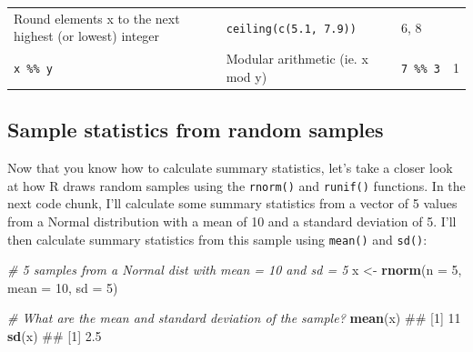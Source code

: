 \documentclass[]{book}
\newenvironment{Shaded}{\begin{snugshade}}{\end{snugshade}}
\newcommand{\KeywordTok}[1]{\textcolor[rgb]{0.13,0.29,0.53}{\textbf{{#1}}}}
\newcommand{\DataTypeTok}[1]{\textcolor[rgb]{0.13,0.29,0.53}{{#1}}}
\newcommand{\DecValTok}[1]{\textcolor[rgb]{0.00,0.00,0.81}{{#1}}}
\newcommand{\StringTok}[1]{\textcolor[rgb]{0.31,0.60,0.02}{{#1}}}
\newcommand{\CommentTok}[1]{\textcolor[rgb]{0.56,0.35,0.01}{\textit{{#1}}}}
\newcommand{\NormalTok}[1]{{#1}}
\theoremstyle{definition}
\theoremstyle{definition}
\theoremstyle{remark}
\begin{document}
\begin{longtable}[]{@{}llll@{}}
\begin{minipage}[t]{0.24\columnwidth}
Round elements x to the next highest (or lowest) integer\strut
\end{minipage} & \begin{minipage}[t]{0.33\columnwidth}\raggedright\strut
\texttt{ceiling(c(5.1,\ 7.9))}\strut
\end{minipage} & \begin{minipage}[t]{0.15\columnwidth}\raggedright\strut
6, 8\strut
\end{minipage}\tabularnewline
\begin{minipage}[t]{0.17\columnwidth}\raggedright\strut
\texttt{x\ \%\%\ y}\strut
\end{minipage} & \begin{minipage}[t]{0.24\columnwidth}\raggedright\strut
Modular arithmetic (ie. x mod y)\strut
\end{minipage} & \begin{minipage}[t]{0.33\columnwidth}\raggedright\strut
\texttt{7\ \%\%\ 3}\strut
\end{minipage} & \begin{minipage}[t]{0.15\columnwidth}\raggedright\strut
1\strut
\end{minipage}\tabularnewline
\bottomrule
\end{longtable}

\subsection{Sample statistics from random
samples}\label{sample-statistics-from-random-samples}

Now that you know how to calculate summary statistics, let's take a
closer look at how R draws random samples using the \texttt{rnorm()} and
\texttt{runif()} functions. In the next code chunk, I'll calculate some
summary statistics from a vector of 5 values from a Normal distribution
with a mean of 10 and a standard deviation of 5. I'll then calculate
summary statistics from this sample using \texttt{mean()} and
\texttt{sd()}:

\begin{Shaded}
\begin{Highlighting}[]
\CommentTok{# 5 samples from a Normal dist with mean = 10 and sd = 5}
\NormalTok{x <-}\StringTok{ }\KeywordTok{rnorm}\NormalTok{(}\DataTypeTok{n =} \DecValTok{5}\NormalTok{, }\DataTypeTok{mean =} \DecValTok{10}\NormalTok{, }\DataTypeTok{sd =} \DecValTok{5}\NormalTok{)}

\CommentTok{# What are the mean and standard deviation of the sample?}
\KeywordTok{mean}\NormalTok{(x)}
\NormalTok{## [1] 11}
\KeywordTok{sd}\NormalTok{(x)}
\NormalTok{## [1] 2.5}
\end{Highlighting}
\end{Shaded}
\end{document}
